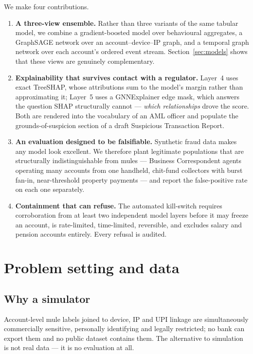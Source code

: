 \documentclass{article}
\begin{document}
We make four contributions.

\begin{enumerate}
\item \textbf{A three-view ensemble.} Rather than three variants of the same
tabular model, we combine a gradient-boosted model over behavioural aggregates,
a GraphSAGE network over an account--device--IP graph, and a temporal graph
network over each account's ordered event stream. Section~\ref{sec:models}
shows that these views are genuinely complementary.

\item \textbf{Explainability that survives contact with a regulator.} Layer~4
uses exact TreeSHAP, whose attributions sum to the model's margin rather than
approximating it; Layer~5 uses a GNNExplainer edge mask, which answers the
question SHAP structurally cannot --- \emph{which relationships} drove the
score. Both are rendered into the vocabulary of an AML officer and populate the
grounds-of-suspicion section of a draft Suspicious Transaction Report.

\item \textbf{An evaluation designed to be falsifiable.} Synthetic fraud data
makes any model look excellent. We therefore plant legitimate populations that
are structurally indistinguishable from mules --- Business Correspondent agents
operating many accounts from one handheld, chit-fund collectors with burst
fan-in, near-threshold property payments --- and report the false-positive rate
on each one separately.

\item \textbf{Containment that can refuse.} The automated kill-switch requires
corroboration from at least two independent model layers before it may freeze an
account, is rate-limited, time-limited, reversible, and excludes salary and
pension accounts entirely. Every refusal is audited.
\end{enumerate}

\section{Problem setting and data}
\label{sec:data}

\subsection{Why a simulator}

Account-level mule labels joined to device, IP and UPI linkage are
simultaneously commercially sensitive, personally identifying and legally
restricted; no bank can export them and no public dataset contains them. The
alternative to simulation is not real data --- it is no evaluation at all.
\end{document}
